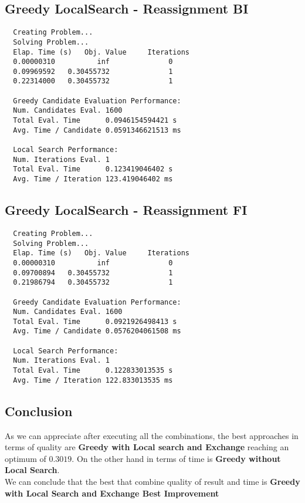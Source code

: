 \documentclass{article}
\begin{document}
\subsection{Greedy LocalSearch - Reassignment BI}
\begin{lstlisting}
  Creating Problem...
  Solving Problem...
  Elap. Time (s)   Obj. Value     Iterations
  0.00000310          inf              0
  0.09969592   0.30455732              1
  0.22314000   0.30455732              1

  Greedy Candidate Evaluation Performance:
  Num. Candidates Eval. 1600
  Total Eval. Time      0.0946154594421 s
  Avg. Time / Candidate 0.0591346621513 ms

  Local Search Performance:
  Num. Iterations Eval. 1
  Total Eval. Time      0.123419046402 s
  Avg. Time / Iteration 123.419046402 ms
\end{lstlisting}

\subsection{Greedy LocalSearch - Reassignment FI}
\begin{lstlisting}
  Creating Problem...
  Solving Problem...
  Elap. Time (s)   Obj. Value     Iterations
  0.00000310          inf              0
  0.09700894   0.30455732              1
  0.21986794   0.30455732              1

  Greedy Candidate Evaluation Performance:
  Num. Candidates Eval. 1600
  Total Eval. Time      0.0921926498413 s
  Avg. Time / Candidate 0.0576204061508 ms

  Local Search Performance:
  Num. Iterations Eval. 1
  Total Eval. Time      0.122833013535 s
  Avg. Time / Iteration 122.833013535 ms
\end{lstlisting} 

\subsection{Conclusion}
As we can appreciate after executing all the combinations, the best approaches
in terms of quality are \textbf{Greedy with Local search and Exchange} reaching
an optimum of $0.3019$. On the other hand in terms of time is \textbf{Greedy
  without Local Search}. \\

We can conclude that the best that combine quality of result and time is
\textbf{Greedy with Local Search and Exchange Best Improvement}
\end{document}
